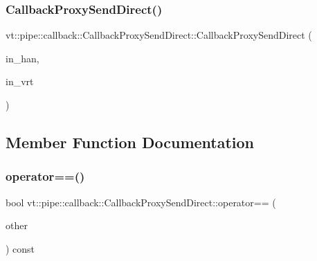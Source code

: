 \subsubsection{\texorpdfstring{Callback\+Proxy\+Send\+Direct()}{CallbackProxySendDirect()}\hspace{0.1cm}{\footnotesize\ttfamily [2/2]}}
{\footnotesize\ttfamily vt\+::pipe\+::callback\+::\+Callback\+Proxy\+Send\+Direct\+::\+Callback\+Proxy\+Send\+Direct (\begin{DoxyParamCaption}\item[{\hyperlink{namespacevt_af64846b57dfcaf104da3ef6967917573}{Handler\+Type} const \&}]{in\+\_\+han,  }\item[{\hyperlink{structvt_1_1pipe_1_1callback_1_1_callback_proxy_send_direct_adbd70e6c1d6b374083e5d0babdcab07e}{Auto\+Handler\+Type}}]{in\+\_\+vrt }\end{DoxyParamCaption})\hspace{0.3cm}{\ttfamily [inline]}}



\subsection{Member Function Documentation}
\mbox{\label{structvt_1_1pipe_1_1callback_1_1_callback_proxy_send_direct_a8ccc6351627fe71b4ca82d2ce2a5a7c1}} 
\subsubsection{\texorpdfstring{operator==()}{operator==()}}
{\footnotesize\ttfamily bool vt\+::pipe\+::callback\+::\+Callback\+Proxy\+Send\+Direct\+::operator== (\begin{DoxyParamCaption}\item[{\hyperlink{structvt_1_1pipe_1_1callback_1_1_callback_proxy_send_direct}{Callback\+Proxy\+Send\+Direct} const \&}]{other }\end{DoxyParamCaption}) const\hspace{0.3cm}{\ttfamily [inline]}}

\mbox{\label{structvt_1_1pipe_1_1callback_1_1_callback_proxy_send_direct_a1a64835cb030af898ad2beaec56d7887}} 
